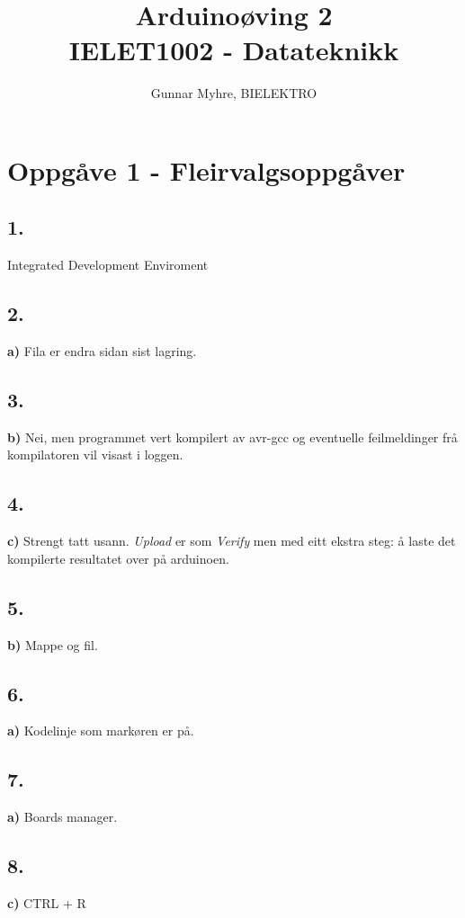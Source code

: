 \documentclass[12pt,a4paper]{article}
\title{%
  Arduinoøving 2 \\
  \large IELET1002 - Datateknikk \\
  }
\author{Gunnar Myhre, BIELEKTRO}
\begin{document}
  \maketitle
  \section*{Oppgåve 1 - Fleirvalgsoppgåver}
    \subsection*{1.}
    Integrated Development Enviroment

    \subsection*{2.}
    \textbf{a)} Fila er endra sidan sist lagring.

    \subsection*{3.}
    \textbf{b)} Nei, men programmet vert kompilert av avr-gcc og eventuelle
    feilmeldinger frå kompilatoren vil visast i loggen.

    \subsection*{4.}
    \textbf{c)} Strengt tatt usann. \textit{Upload} er som \textit{Verify} men
    med eitt ekstra steg: å laste det kompilerte resultatet over på arduinoen.

    \subsection*{5.}
    \textbf{b)} Mappe og fil.

    \subsection*{6.}
    \textbf{a)} Kodelinje som markøren er på.

    \subsection*{7.}
    \textbf{a)} Boards manager.

    \subsection*{8.}
    \textbf{c)} CTRL + R
\end{document}
